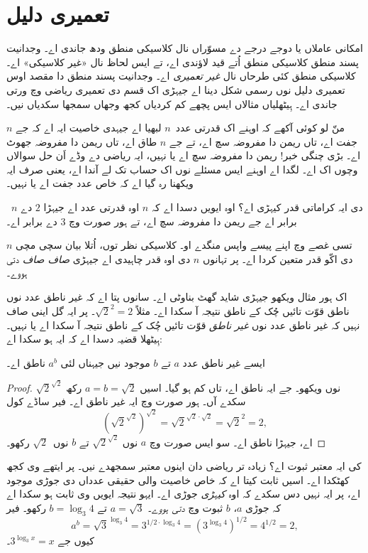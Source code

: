 \documentclass[../../../include/open-logic-chapter]{subfiles}
\begin{document}

\section{تعمیری دلیل}

امکانی عاملاں یا دوجے درجے دے مسوّراں نال کلاسیکی منطق ودھ جاندی
اے۔ وجدانیت پسند منطق کلاسیکی منطق اُتے قید لاؤندی اے، تے ایس لحاظ
نال «غیر کلاسیکی» اے۔ کلاسیکی منطق کئی طرحاں نال \emph{غیر تعمیری} اے۔
وجدانیت پسند منطق دا مقصد اوس تعمیری دلیل نوں رسمی شکل دینا اے جیہڑی
اک قسم دی تعمیری ریاضی وچ ورتی جاندی اے۔ ہِیٹھلیاں مثالاں ایس پچھے
کم کردیاں کجھ وجھاں سمجھا سکدیاں نیں۔

منّ لو کوئی آکھے کہ اوہنے اک قدرتی عدد~$n$ لبھیا اے جیہدی خاصیت
ایہ اے کہ جے $n$ جفت اے، تاں ریمن دا مفروضہ سچ اے، تے جے $n$ طاق
اے، تاں ریمن دا مفروضہ جھوٹ اے۔ بڑی چنگی خبر!{} ریمن دا مفروضہ سچ
اے یا نہیں، ایہ ریاضی دے وڈے اَن حل سوالاں وچوں اک اے۔ لگدا اے
اوہنے ایس مسئلے نوں اک حساب تک لے آندا اے، یعنی صرف ایہ ویکھنا
رہ گیا اے کہ خاص عدد جفت اے یا نہیں۔

~$n$ دی ایہ کراماتی قدر کیہڑی اے؟ اوہ ایویں دسدا اے کہ $n$ اوہ
قدرتی عدد اے جیہڑا $2$ دے برابر اے جے ریمن دا مفروضہ سچ اے، تے
ہور صورت وچ $3$ دے برابر اے۔

تسی غصے وچ اپنے پیسے واپس منگدے او۔ کلاسیکی نظر توں، اُتلا بیان
سچی مچی $n$ دی اکّو قدر متعین کردا اے۔ پر تہانوں $n$ دی اوہ قدر
چاہیدی اے جیہڑی \emph{صاف صاف} دتی ہووے۔

اک ہور مثال ویکھو جیہڑی شاید گھٹ بناوٹی اے۔ سانوں پتا اے کہ
غیر ناطق عدد نوں ناطق قوّت تائیں چُک کے ناطق نتیجہ آ سکدا اے۔
مثلاً $\sqrt{2}^2 = 2$۔ پر ایہ گل اینی صاف نہیں کہ غیر ناطق عدد
نوں \emph{غیر ناطق} قوّت تائیں چُک کے ناطق نتیجہ آ سکدا اے یا نہیں۔
ہِیٹھلا قضیہ دسدا اے کہ ایہ ہو سکدا اے:

\begin{thm}
ایسے غیر ناطق عدد $a$ تے $b$ موجود نیں جیہناں لئی $a^b$ ناطق اے۔
\end{thm}

\begin{proof}
$\sqrt{2}^{\sqrt{2}}$ نوں ویکھو۔ جے ایہ ناطق اے، تاں کم ہو گیا۔
اسیں $a = b = \sqrt{2}$ رکھ سکدے آں۔ ہور صورت وچ ایہ غیر ناطق
اے۔ فیر ساڈے کول
\[
(\sqrt{2}^{\sqrt{2}})^{\sqrt{2}} = \sqrt{2}^{\sqrt{2} \cdot
  \sqrt{2}} = \sqrt{2}^2 = 2,
\]
اے، جیہڑا ناطق اے۔ سو ایس صورت وچ $a$ نوں $\sqrt{2}^{\sqrt{2}}$
تے $b$ نوں~$\sqrt 2$ رکھو۔
\end{proof}

کی ایہ معتبر ثبوت اے؟ زیادہ تر ریاضی دان اینوں معتبر سمجھدے
نیں۔ پر ایتھے وی کجھ کھٹکدا اے۔ اسیں ثابت کیتا اے کہ خاص خاصیت
والی حقیقی عدداں دی جوڑی موجود اے، پر ایہ نہیں دس سکدے کہ
اوہ \emph{کیہڑی} جوڑی اے۔ ایہو نتیجہ ایویں وی ثابت ہو سکدا اے
کہ جوڑی $a$، $b$ ثبوت وچ \emph{دتی ہووے}۔ $a = \sqrt{3}$ تے
$b = \log_3 4$ رکھو۔ فیر
\[
a^b = \sqrt{3}^{\log_3 4} = 3^{1/2 \cdot \log_3 4} = (3^{\log_3
  4})^{1/2} = 4^{1/2}= 2,
\]
کیوں جے $3^{\log_3 x} = x$۔
\end{document}
